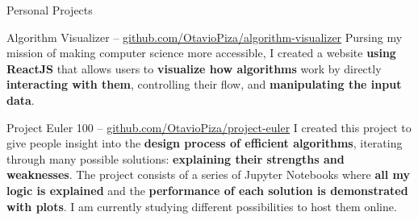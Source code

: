 \documentclass{article}
\newlength{\tabin}
\newlength{\secsep}
\newcommand{\lineunder}{\vspace*{-8pt} \\ \hspace*{-6pt} \hrulefill \\ \vspace*{-15pt}}
\newenvironment{tabbedsection}[1]{
  \begin{list}{}{
      \setlength{\itemsep}{0pt}
      \setlength{\labelsep}{0pt}
      \setlength{\labelwidth}{0pt}
      \setlength{\leftmargin}{\tabin}
      \setlength{\rightmargin}{\tabin}
      \setlength{\listparindent}{0pt}
      \setlength{\parsep}{0pt}
      \setlength{\parskip}{0pt}
      \setlength{\partopsep}{0pt}
      \setlength{\topsep}{#1}
    }
  \item[]
}{\end{list}}
\newenvironment{resume_section}[1]{
  \filbreak
  \vspace{2\secsep}
  \textsc{\large#1}
  \lineunder
  \begin{tabbedsection}{\secsep}
}{\end{tabbedsection}}
\newenvironment{resume_subsection}[2][]{
  \textbf{#2} \hfill {\footnotesize #1} \hspace{2em}
  \begin{tabbedsection}{0.5\secsep}
}{\end{tabbedsection}}
\begin{document}
\begin{resume_section}{Personal Projects}

	\begin{resume_subsection}{Algorithm Visualizer -- \href{https://www.github.com/OtavioPiza/algorithm-visualizer}{github.com/OtavioPiza/algorithm-visualizer}}
		Pursing my mission of making computer science more accessible, I created a website \textbf{using ReactJS} that allows users to \textbf{visualize how algorithms} work by directly \textbf{interacting with them}, controlling their flow, and \textbf{manipulating the input data}. 
	\end{resume_subsection}
	
	\begin{resume_subsection}{Project Euler 100 -- \href{https://www.github.com/OtavioPiza/project-euler}{github.com/OtavioPiza/project-euler}}
		I created this project to give people insight into the \textbf{design process of efficient algorithms}, iterating through many possible solutions: \textbf{explaining their strengths and weaknesses}. The project consists of a series of Jupyter Notebooks where \textbf{all my logic is explained} and the \textbf{performance of each solution is demonstrated with plots}. I am currently studying different possibilities to host them online.  
	\end{resume_subsection}

\end{resume_section}
\end{document}
